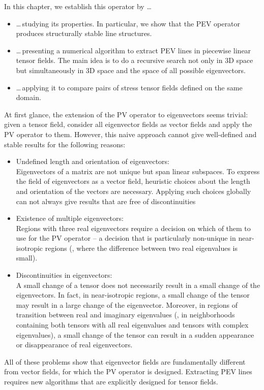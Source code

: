 %
In this chapter, we establish this operator by \ldots
%
\begin{itemize}
    \item
    \ldots{}\,studying its properties.
    In particular, we show that the \ac{PEV} operator produces structurally
    stable line structures.
    \item
    \ldots{}\,presenting a numerical algorithm to extract \ac{PEV} lines in
    piecewise linear tensor fields.
    The main idea is to do a recursive search not only in \ac{3D} space but
    simultaneously in \ac{3D} space and the space of all possible eigenvectors.
    \item
    \ldots{}\,applying it to compare pairs of stress tensor fields defined on
    the same domain.
\end{itemize}
%
At first glance, the extension of the \ac{PV} operator to eigenvectors seems
trivial:
%
given a tensor field, consider all eigenvector fields as vector fields and apply
the \ac{PV} operator to them.
%
However, this naive approach cannot give well-defined and stable results for
the following reasons:
%
\begin{itemize}
    \item Undefined length and orientation of eigenvectors:\\
    Eigenvectors of a matrix are not unique but span linear subspaces.
    To express the field of eigenvectors as a vector field, heuristic
    choices about the length and orientation of the vectors are necessary.
    Applying such choices globally can not always give results that are free of
    discontinuities
    \item Existence of multiple eigenvectors:\\
    Regions with three real eigenvectors require a decision on which of them to
    use for the \ac{PV} operator -- a decision that is particularly non-unique
    in near-isotropic regions
    (\ie{}, where the difference between two real eigenvalues is small).
    \item Discontinuities in eigenvectors:\\
    A small change of a tensor does not necessarily result in a small change of
    the eigenvectors.
    In fact, in near-isotropic regions, a small change of the tensor may result
    in a large change of the eigenvector.
    Moreover, in regions of transition between real and imaginary eigenvalues
    (\ie{}, in neighborhoods containing both tensors with all real eigenvalues and
    tensors with complex eigenvalues), a small change of the tensor can result
    in a sudden appearance or disappearance of real eigenvectors.
\end{itemize}
%
All of these problems show that eigenvector fields are fundamentally different
from vector fields, for which the \ac{PV} operator is designed.
%
Extracting \ac{PEV} lines requires new algorithms that are explicitly designed
for tensor fields.
%

